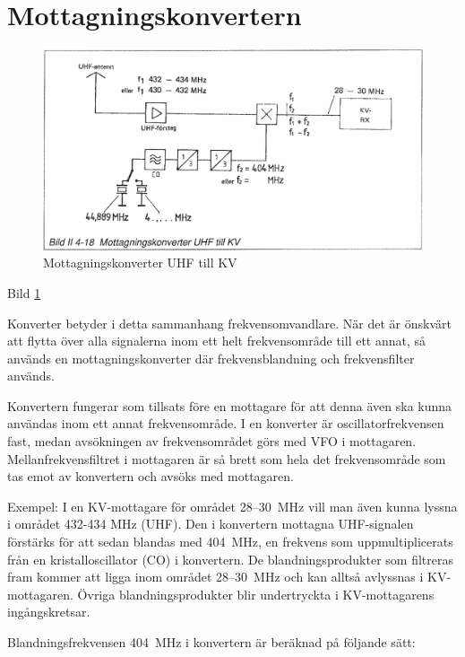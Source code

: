 \section{Mottagningskonvertern}

\begin{figure}
  \includegraphics[width=\textwidth]{images/bild_2_4-18}
  \caption{Mottagningskonverter UHF till KV}
  \label{fig:bildII4-18}
\end{figure}

Bild \ref{fig:bildII4-18}

Konverter betyder i detta sammanhang frekvensomvandlare. När det är
önskvärt att flytta över alla signalerna inom ett helt frekvensområde
till ett annat, så används en mottagningskonverter där
frekvensblandning och frekvensfilter används.

Konvertern fungerar som tillsats före en mottagare för att denna även
ska kunna användas inom ett annat frekvensområde. I en konverter är
oscillatorfrekvensen fast, medan avsökningen av frekvensområdet görs
med VFO i mottagaren. Mellanfrekvensfiltret i mottagaren är så brett
som hela det frekvensområde som tas emot av konvertern och avsöks med
mottagaren.

Exempel: I en KV-mottagare för området 28--30~MHz vill man även kunna
lyssna i området 432-434 MHz (UHF). Den i konvertern mottagna
UHF-signalen förstärks för att sedan blandas med 404~MHz, en frekvens
som uppmultiplicerats från en kristalloscillator (CO) i konvertern. De
blandningsprodukter som filtreras fram kommer att ligga inom området
28--30~MHz och kan alltså avlyssnas i KV-mottagaren. Övriga
blandningsprodukter blir undertryckta i KV-mottagarens ingångskretsar.

Blandningsfrekvensen 404~MHz i konvertern är beräknad på följande sätt:

